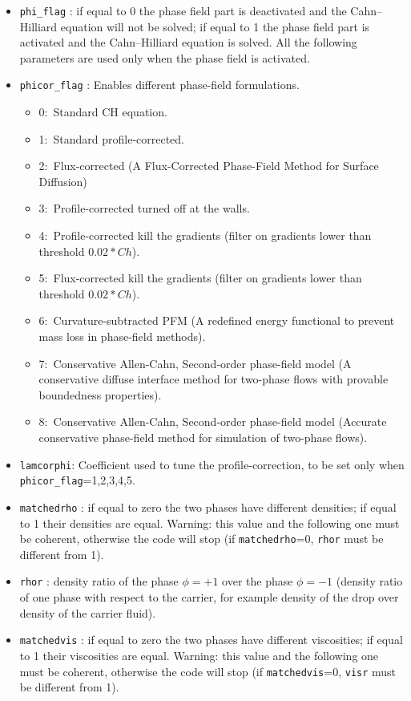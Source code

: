 \begin{itemize}[label={$\circ$}]
\item \texttt{phi\_flag} : if equal to 0 the phase field part is deactivated and the Cahn--Hilliard equation will not be solved; if equal to 1 the phase field part is activated and the Cahn--Hilliard equation is solved. 
All the following parameters are used only when the phase field is activated.
\item \texttt{phicor\_flag} : Enables different phase-field formulations.
\begin{itemize}[label={$\circ$}]
\item 0:~Standard CH equation.
\item 1:~Standard profile-corrected.
\item 2:~Flux-corrected (A Flux-Corrected Phase-Field Method for Surface Diffusion)
\item 3:~Profile-corrected turned off at the walls.
\item 4:~Profile-corrected kill the gradients (filter on gradients lower than threshold $0.02*Ch$).
\item 5:~Flux-corrected kill the gradients (filter on gradients lower than threshold $0.02*Ch$).
\item 6:~Curvature-subtracted PFM (A redefined energy functional to prevent mass loss in phase-field methods).
\item 7:~Conservative Allen-Cahn, Second-order phase-field model (A conservative diffuse interface method for two-phase flows with provable boundedness properties).
\item 8:~Conservative Allen-Cahn, Second-order phase-field model (Accurate conservative phase-field method for simulation of two-phase flows).
\end{itemize}
\item \texttt{lamcorphi}: Coefficient used to tune the profile-correction, to be set only when \texttt{phicor\_flag}=1,2,3,4,5.
\item \texttt{matchedrho} : if equal to zero the two phases have different densities; if equal to 1 their densities are equal. Warning: this value and the following one must be coherent, otherwise the code will stop (if \texttt{matchedrho}=0, \texttt{rhor} must be different from 1).
\item \texttt{rhor} : density ratio of the phase $\phi=+1$ over the phase $\phi=-1$ (density ratio of one phase with respect to the carrier, for example density of the drop over density of the carrier fluid).
\item \texttt{matchedvis} : if equal to zero the two phases have different viscosities; if equal to 1 their viscosities are equal. Warning: this value and the following one must be coherent, otherwise the code will stop (if \texttt{matchedvis}=0, \texttt{visr} must be different from 1).

\end{itemize}
